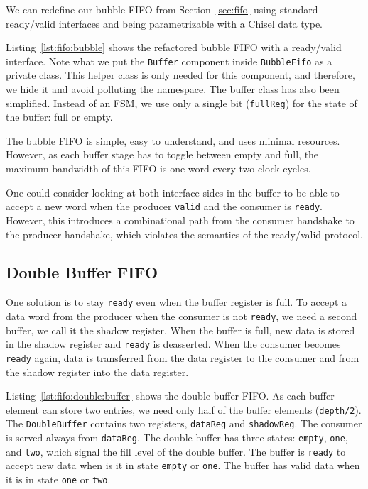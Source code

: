 \documentclass[%
    10pt,
    headinclude, footexclude,
    openright, %
    notitlepage,
    cleardoubleempty,
    headsepline,
    pointlessnumbers,
    bibtotoc, idxtotoc,
    ]{scrbook}
\newcommand{\code}[1]{{\lstinline[basicstyle=\small\ttfamily]{#1}}}
\begin{document}
We can redefine our bubble FIFO from Section~\ref{sec:fifo} using standard
ready/valid interfaces and being parametrizable with a Chisel data type.


Listing~\ref{lst:fifo:bubble} shows the refactored bubble FIFO with a ready/valid
interface. Note what we put the \code{Buffer} component inside \code{BubbleFifo}
as a private class. This helper class is only needed for this component, and therefore,
we hide it and avoid polluting the namespace. The buffer class has also been
simplified. Instead of an FSM, we use only a single bit (\code{fullReg}) for
the state of the buffer: full or empty.

The bubble FIFO is simple, easy to understand, and uses minimal resources.
However, as each buffer stage has to toggle between empty and full, the maximum
bandwidth of this FIFO is one word every two clock cycles.

One could consider looking at both interface sides in the buffer to be able to accept
a new word when the producer \code{valid} and the consumer is \code{ready}.
However, this introduces a combinational path from the consumer handshake
to the producer handshake, which violates the semantics of the ready/valid protocol.

\subsection{Double Buffer FIFO}


One solution is to stay \code{ready} even when the buffer register is full.
To accept a data word from the producer when the consumer is not
\code{ready}, we need a second buffer, we call it the shadow register.
When the buffer is full, new data is stored in the shadow register and \code{ready}
is deasserted. When the consumer becomes \code{ready} again, data is transferred
from the data register to the consumer and from the shadow register into
the data register.

\newpage
{}


Listing~\ref{lst:fifo:double:buffer} shows the double buffer FIFO. As each buffer element
can store two entries, we need only half of the buffer elements (\code{depth/2}).
The \code{DoubleBuffer} contains two registers,
\code{dataReg} and \code{shadowReg}. The consumer is served always from
\code{dataReg}. The double buffer has three states: \code{empty}, \code{one},
and \code{two}, which signal the fill level of the double buffer.
The buffer is \code{ready} to accept new data when is it in state \code{empty}
or \code{one}. The buffer has valid data when it is in state \code{one} or \code{two}.
\end{document}
